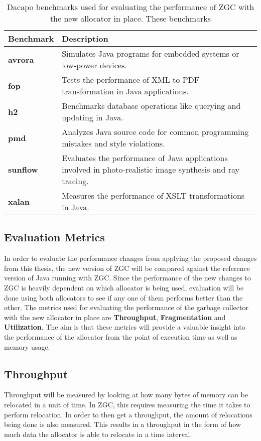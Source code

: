 \begin{table}[H]
  \centering
  \begin{tabular}{|l|l|}
    \hline
    \textbf{Benchmark} & \textbf{Description} \\ \hline
    \textbf{avrora} & Simulates Java programs for embedded systems or low-power devices. \\ \hline
    \textbf{fop} & Tests the performance of XML to PDF transformation in Java applications. \\ \hline
    \textbf{h2} & Benchmarks database operations like querying and updating in Java. \\ \hline
    \textbf{pmd} & Analyzes Java source code for common programming mistakes and style violations. \\ \hline
    \textbf{sunflow} & Evaluates the performance of Java applications involved in photo-realistic image synthesis and ray tracing. \\ \hline
    \textbf{xalan} & Measures the performance of XSLT transformations in Java. \\ \hline
  \end{tabular}
  \caption{Dacapo benchmarks used for evaluating the performance of ZGC with the new allocator in place. These benchmarks}
  \label{table:dacapo_benchmarks}
\end{table}

\subsection{Evaluation Metrics}
In order to evaluate the performance changes from applying the proposed changes from this thesis, the new version of ZGC will be compared against the reference version of Java running with ZGC. Since the performance of the new changes to ZGC is heavily dependent on which allocator is being used, evaluation will be done using both allocators to see if any one of them performs better than the other. The metrics used for evaluating the performance of the garbage collector with the new allocator in place are \textbf{Throughput}, \textbf{Fragmentation} and \textbf{Utilization}. The aim is that these metrics will provide a valuable insight into the performance of the allocator from the point of execution time as well as memory usage. 

\subsection{Throughput}
Throughput will be measured by looking at how many bytes of memory can be relocated in a unit of time. In ZGC, this requires measuring the time it takes to perform relocation. In order to then get a throughput, the amount of relocations being done is also measured. This results in a throughput in the form of how much data the allocator is able to relocate in a time interval. 

